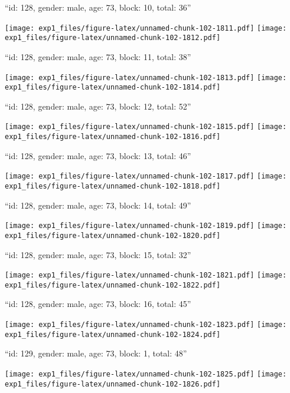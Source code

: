 \documentclass[11pt,,]{article}
\begin{document}
\newpage
[1] 

``id: 128, gender: male, age: 73, block: 10, total: 36''

\texttt{[image: exp1\_files/figure-latex/unnamed-chunk-102-1811.pdf]}
\texttt{[image: exp1\_files/figure-latex/unnamed-chunk-102-1812.pdf]}

\newpage
[1] 

``id: 128, gender: male, age: 73, block: 11, total: 38''

\texttt{[image: exp1\_files/figure-latex/unnamed-chunk-102-1813.pdf]}
\texttt{[image: exp1\_files/figure-latex/unnamed-chunk-102-1814.pdf]}

\newpage
[1] 

``id: 128, gender: male, age: 73, block: 12, total: 52''

\texttt{[image: exp1\_files/figure-latex/unnamed-chunk-102-1815.pdf]}
\texttt{[image: exp1\_files/figure-latex/unnamed-chunk-102-1816.pdf]}

\newpage
[1] 

``id: 128, gender: male, age: 73, block: 13, total: 46''

\texttt{[image: exp1\_files/figure-latex/unnamed-chunk-102-1817.pdf]}
\texttt{[image: exp1\_files/figure-latex/unnamed-chunk-102-1818.pdf]}

\newpage
[1] 

``id: 128, gender: male, age: 73, block: 14, total: 49''

\texttt{[image: exp1\_files/figure-latex/unnamed-chunk-102-1819.pdf]}
\texttt{[image: exp1\_files/figure-latex/unnamed-chunk-102-1820.pdf]}

\newpage
[1] 

``id: 128, gender: male, age: 73, block: 15, total: 32''

\texttt{[image: exp1\_files/figure-latex/unnamed-chunk-102-1821.pdf]}
\texttt{[image: exp1\_files/figure-latex/unnamed-chunk-102-1822.pdf]}

\newpage
[1] 

``id: 128, gender: male, age: 73, block: 16, total: 45''

\texttt{[image: exp1\_files/figure-latex/unnamed-chunk-102-1823.pdf]}
\texttt{[image: exp1\_files/figure-latex/unnamed-chunk-102-1824.pdf]}

\newpage
[1] 

``id: 129, gender: male, age: 73, block: 1, total: 48''

\texttt{[image: exp1\_files/figure-latex/unnamed-chunk-102-1825.pdf]}
\texttt{[image: exp1\_files/figure-latex/unnamed-chunk-102-1826.pdf]}
\end{document}
